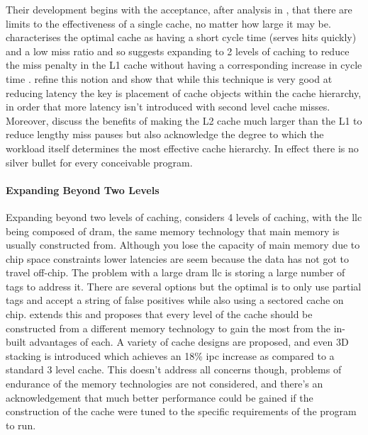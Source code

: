 Their development begins with the acceptance, after analysis in \citet{przybylskiPerformanceTradeoffsCache1988}, that there are limits to the effectiveness of a single cache, no matter how large it may be. \citet{przybylskiCharacteristicsPerformanceOptimalMultilevel1989} characterises the optimal cache as having a short cycle time (serves hits quickly) and a low miss ratio and so suggests expanding to 2 levels of caching to reduce the miss penalty in the L1 cache without having a corresponding increase in cycle time \cite{jouppiTradeoffsTwolevelOnchip1994}. \citet{azimiTwoLevelCache1992} refine this notion and show that while this technique is very good at reducing latency the key is placement of cache objects within the cache hierarchy, in order that more latency isn't introduced with second level cache misses. Moreover, \citet{tangPerformanceDesignChoices1994} discuss the benefits of making the L2 cache much larger than the L1 to reduce lengthy miss pauses but also acknowledge the degree to which the workload itself determines the most effective cache hierarchy. In effect there is no silver bullet for every conceivable program. 

\paragraph{Expanding Beyond Two Levels}

Expanding beyond two levels of caching, \citet{zhaoExploringDRAMCache2007} considers 4 levels of caching, with the \gls{llc} being composed of \gls{dram}, the same memory technology that main memory is usually constructed from. Although you lose the capacity of main memory due to chip space constraints lower latencies are seem because the data has not got to travel off-chip. The problem with a large \gls{dram} \gls{llc} is storing a large number of tags to address it. There are several options but the optimal is to only use partial tags and accept a string of false positives while also using a sectored cache on chip. \citet{wuHybridCacheArchitecture2009} extends this and proposes that every level of the cache should be constructed from a different memory technology to gain the most from the in-built advantages of each. A variety of cache designs are proposed, and even 3D stacking is introduced which achieves an 18\% \gls{ipc} increase as compared to a standard 3 level cache. This doesn't address all concerns though, problems of endurance of the memory technologies are not considered,  and there's an acknowledgement that much better performance could be gained if the construction of the cache were tuned to the specific requirements of the program to run. 


